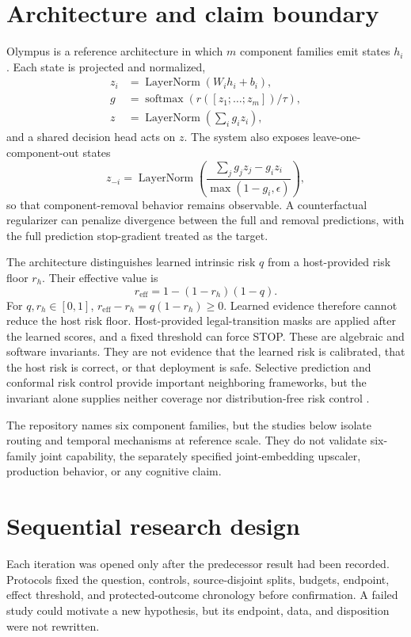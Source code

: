 \documentclass[10pt]{article}
\newcommand{\softmax}{\operatorname{softmax}}
\begin{document}
\section{Architecture and claim boundary}
Olympus is a reference architecture in which $m$ component families emit states $h_i$.
Each state is projected and normalized,
\begin{align}
z_i &= \operatorname{LayerNorm}(W_i h_i+b_i), \\
g &= \softmax(r([z_1;\ldots;z_m])/\tau), \\
z &= \operatorname{LayerNorm}\left(\sum_i g_i z_i\right),
\end{align}
and a shared decision head acts on $z$. The system also exposes leave-one-component-out
states
\begin{equation}
z_{-i}=\operatorname{LayerNorm}\left(
\frac{\sum_j g_jz_j-g_iz_i}{\max(1-g_i,\epsilon)}\right),
\end{equation}
so that component-removal behavior remains observable. A counterfactual regularizer can
penalize divergence between the full and removal predictions, with the full prediction
stop-gradient treated as the target.

The architecture distinguishes learned intrinsic risk $q$ from a host-provided risk floor
$r_h$. Their effective value is
\begin{equation}
r_{\mathrm{eff}}=1-(1-r_h)(1-q).
\end{equation}
For $q,r_h\in[0,1]$, $r_{\mathrm{eff}}-r_h=q(1-r_h)\geq0$. Learned evidence therefore
cannot reduce the host risk floor. Host-provided legal-transition masks are applied after
the learned scores, and a fixed threshold can force STOP. These are algebraic and software
invariants. They are not evidence that the learned risk is calibrated, that the host risk
is correct, or that deployment is safe. Selective prediction and conformal risk control
provide important neighboring frameworks, but the invariant alone supplies neither
coverage nor distribution-free risk control \cite{geifman2019selectivenet,
angelopoulos2022crc}.

The repository names six component families, but the studies below isolate routing and
temporal mechanisms at reference scale. They do not validate six-family joint capability,
the separately specified joint-embedding upscaler, production behavior, or any cognitive
claim.

\section{Sequential research design}
Each iteration was opened only after the predecessor result had been recorded. Protocols
fixed the question, controls, source-disjoint splits, budgets, endpoint, effect threshold,
and protected-outcome chronology before confirmation. A failed study could motivate a new
hypothesis, but its endpoint, data, and disposition were not rewritten.
\end{document}
